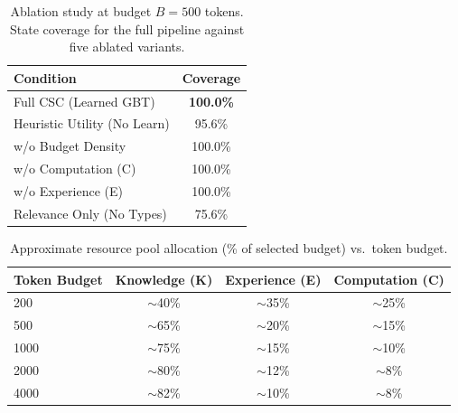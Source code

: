 \documentclass{article}
\begin{document}
\begin{table}[h]
\caption{Ablation study at budget $B=500$ tokens. State coverage for the full pipeline against five ablated variants.}
\centering
\begin{tabular}{lc}
\toprule
Condition & Coverage \\
\midrule
Full CSC (Learned GBT) & \textbf{100.0\%} \\
Heuristic Utility (No Learn) & 95.6\% \\
w/o Budget Density & 100.0\% \\
w/o Computation (C) & 100.0\% \\
w/o Experience (E) & 100.0\% \\
Relevance Only (No Types) & 75.6\% \\
\bottomrule
\end{tabular}
\end{table}

\begin{table}[h]
\caption{Approximate resource pool allocation (\% of selected budget) vs.\ token budget.}
\centering
\begin{tabular}{lccc}
\toprule
Token Budget & Knowledge (K) & Experience (E) & Computation (C) \\
\midrule
200 & $\sim$40\% & $\sim$35\% & $\sim$25\% \\
500 & $\sim$65\% & $\sim$20\% & $\sim$15\% \\
1000 & $\sim$75\% & $\sim$15\% & $\sim$10\% \\
2000 & $\sim$80\% & $\sim$12\% & $\sim$8\% \\
4000 & $\sim$82\% & $\sim$10\% & $\sim$8\% \\
\bottomrule
\end{tabular}
\end{table}


\end{document}
